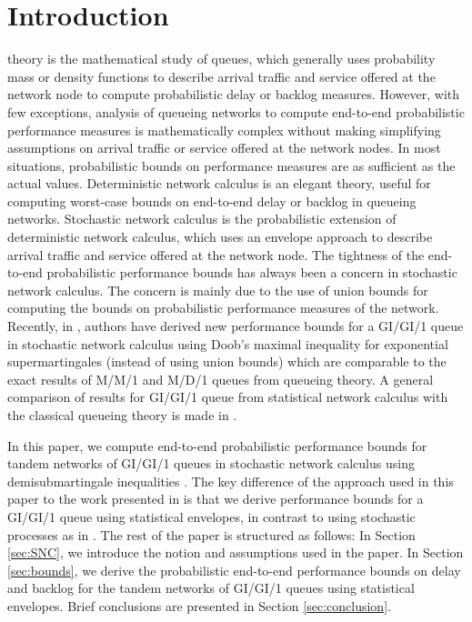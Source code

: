 \documentclass[letterpaper]{IEEEtran}
\begin{document}
\section{Introduction}
 theory is the mathematical study of queues, which generally uses probability mass or density functions to describe arrival traffic and service offered at the network node to compute probabilistic delay or backlog measures. However, with few exceptions, analysis of queueing networks to compute end-to-end probabilistic performance measures is mathematically complex without making simplifying assumptions on arrival traffic or service offered at the network nodes. In most situations, probabilistic bounds on performance measures are as sufficient as the actual values. Deterministic network calculus is an elegant theory, useful for computing worst-case bounds on end-to-end delay or backlog in queueing networks. Stochastic network calculus is the probabilistic extension of deterministic network calculus, which uses an envelope approach to describe arrival traffic and service offered at the network node. The tightness of the end-to-end probabilistic performance bounds has always been a concern in stochastic network calculus. The concern is mainly due to the use of union bounds for computing the bounds on probabilistic performance measures of the network. Recently, in \cite{florin:2007-1,florin:2007-2}, authors have derived new performance bounds for a GI/GI/1 queue in stochastic network calculus using Doob's maximal inequality for exponential supermartingales (instead of using union bounds) which are comparable to the exact results of M/M/1 and M/D/1 queues from queueing theory. A general comparison of results for GI/GI/1 queue from statistical network calculus with the classical queueing theory is made in \cite{jiang:2009}. 

In this paper, we compute end-to-end probabilistic performance bounds for tandem networks of GI/GI/1 queues in stochastic network calculus using demisubmartingale inequalities \cite{chris:2003,rao:2007}. The key difference of the approach used in this paper to the work presented in \cite{florin:2007-1,florin:2007-2} is that we derive performance bounds for a GI/GI/1 queue using statistical envelopes, in contrast to using stochastic processes as in \cite{florin:2007-1,florin:2007-2}. The rest of the paper is structured as follows: In Section \ref{sec:SNC}, we introduce the notion and assumptions used in the paper. In Section \ref{sec:bounds}, we derive the probabilistic end-to-end performance bounds on delay and backlog for the tandem networks of GI/GI/1 queues using statistical envelopes. Brief conclusions are presented in Section \ref{sec:conclusion}. 
\end{document}
